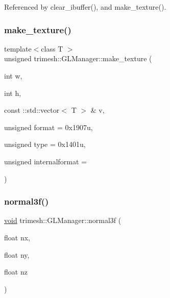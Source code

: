 Referenced by clear\+\_\+ibuffer(), and make\+\_\+texture().

\mbox{\label{classtrimesh_1_1GLManager_a9afecf2d00750e53992042d8f548b2bb}} 
\subsubsection{\texorpdfstring{make\+\_\+texture()}{make\_texture()}\hspace{0.1cm}{\footnotesize\ttfamily [2/2]}}
{\footnotesize\ttfamily template$<$class T $>$ \\
unsigned trimesh\+::\+G\+L\+Manager\+::make\+\_\+texture (\begin{DoxyParamCaption}\item[{int}]{w,  }\item[{int}]{h,  }\item[{const \+::std\+::vector$<$ T $>$ \&}]{v,  }\item[{unsigned}]{format = {\ttfamily 0x1907u},  }\item[{unsigned}]{type = {\ttfamily 0x1401u},  }\item[{unsigned}]{internalformat = {} }\end{DoxyParamCaption})\hspace{0.3cm}{\ttfamily [inline]}}

\mbox{\label{classtrimesh_1_1GLManager_afe4faedc9209cad4f27e0d3e359084eb}} 
\subsubsection{\texorpdfstring{normal3f()}{normal3f()}}
{\footnotesize\ttfamily \hyperlink{namespacetrimesh_a784ddfd979e1c579bda795a8edfc3f43}{void} trimesh\+::\+G\+L\+Manager\+::normal3f (\begin{DoxyParamCaption}\item[{float}]{nx,  }\item[{float}]{ny,  }\item[{float}]{nz }\end{DoxyParamCaption})}



